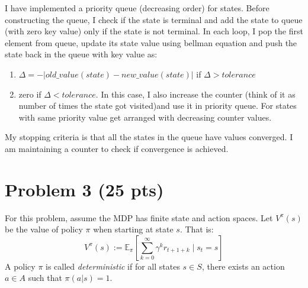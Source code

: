 \documentclass[12pt]{article}
\begin{document}
\begin{enumerate}[a)]
\begin{solution}
I have implemented a priority queue (decreasing order) for states. Before constructing the queue, I check if the state is terminal and add the state to queue (with zero key value) only if the state is not terminal. In each loop, I pop the first element from queue, update its state value using bellman equation and push the state back in the queue with key value as:
\begin{enumerate}
\item $\Delta = -|old\_value(state) - new\_value(state)|$ if $\Delta > tolerance$
\item zero if $\Delta < tolerance$. In this case, I also increase the counter (think of it as number of times the state got visited)and use it in priority queue. For states with same priority value get arranged with decreasing counter values.
\end{enumerate} 
My stopping criteria is that all the states in the queue have values converged. I am maintaining a counter to check if convergence is achieved.
\end{solution}

\end{enumerate}



\section*{Problem 3 (25 pts)} 

For this problem, assume the MDP has finite state and action spaces. Let $V^\pi(s)$ be the value of policy $\pi$ when starting at state $s$. That is:
\[
V^\pi(s) := \mathbb{E}_\pi \left[ \sum_{k=0}^\infty \gamma^k r_{t+1+k} \mid s_t = s \right]
\]
A policy $\pi$ is called {\it deterministic} if for all states $s\in S$, there exists an action $a\in A$ such that $\pi(a|s) = 1$.
\end{document}
